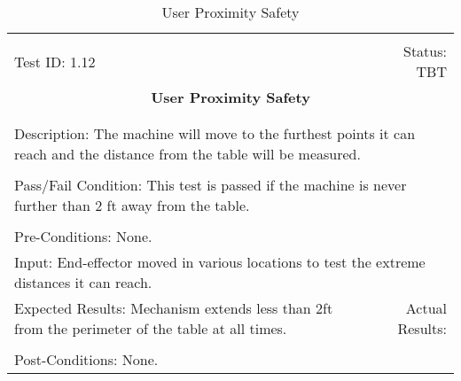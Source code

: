 \documentclass[titlepage]{article}
\begin{document}
\begin{center}%
\begin{table}[h!]
\begin{tabular}{|l r|}\hline&\\[-2mm]
	Test ID: 1.12	&Status: TBT\\[-3mm]
	\multicolumn{2}{|c|}{\textbf{\large{User Proximity Safety}}}\\&\\\hline&\\[-3mm]
	\multicolumn{2}{|p{\textwidth}|}{Description: The machine will move to the furthest points it can reach and the distance from the table will be measured.}\\[1mm]\hline&\\[-3mm]
	\multicolumn{2}{|p{\textwidth}|}{Pass/Fail Condition: This test is passed if the machine is never further than 2 ft away from the table.}\\[1mm]\hline&\\[-3mm]
	\multicolumn{2}{|p{\textwidth}|}{Pre-Conditions: None.}\\[4mm]
	\multicolumn{2}{|p{\textwidth}|}{Input: End-effector moved in various locations to test the extreme distances it can reach.}\\[2mm]\hline
	\multicolumn{1}{|p{0.49\textwidth}}{Expected Results: Mechanism extends less than 2ft from the perimeter of the table at all times.}	&\multicolumn{1}{|p{0.45\textwidth}|}{Actual Results:}\\\hline&\\[-3mm]
	\multicolumn{2}{|p{\textwidth}|}{Post-Conditions: None.}\\\hline
\end{tabular}
\caption{User Proximity Safety}
\end{table}
\end{center}
\end{document}
